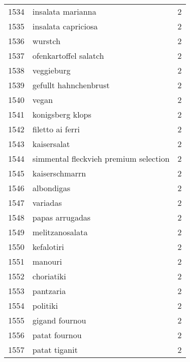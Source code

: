 \begin{tabular}{llr}
1534 &                                  insalata marianna &      2 \\
1535 &                                insalata capriciosa &      2 \\
1536 &                                            wurstch &      2 \\
1537 &                              ofenkartoffel salatch &      2 \\
1538 &                                         veggieburg &      2 \\
1539 &                              gefullt hahnchenbrust &      2 \\
1540 &                                              vegan &      2 \\
1541 &                                   konigsberg klops &      2 \\
1542 &                                   filetto ai ferri &      2 \\
1543 &                                        kaisersalat &      2 \\
1544 &              simmental fleckvieh premium selection &      2 \\
1545 &                                     kaiserschmarrn &      2 \\
1546 &                                         albondigas &      2 \\
1547 &                                           variadas &      2 \\
1548 &                                    papas arrugadas &      2 \\
1549 &                                    melitzanosalata &      2 \\
1550 &                                         kefalotiri &      2 \\
1551 &                                            manouri &      2 \\
1552 &                                         choriatiki &      2 \\
1553 &                                          pantzaria &      2 \\
1554 &                                           politiki &      2 \\
1555 &                                     gigand fournou &      2 \\
1556 &                                      patat fournou &      2 \\
1557 &                                      patat tiganit &      2 \\

\end{tabular}
